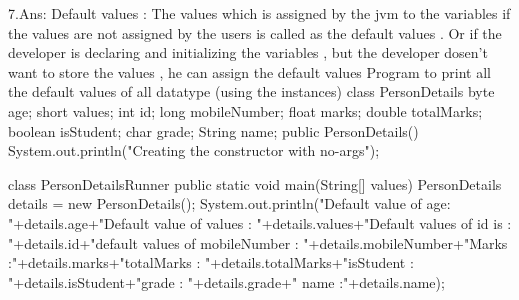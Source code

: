 7.Ans: Default values :  The values which is assigned by the jvm to the variables if the values are not assigned by the users is called as the default values . Or if the developer is declaring and initializing the variables , but the developer dosen't want to store the values , he can assign the default values 
Program to print all the default values of all datatype (using the instances) 
class PersonDetails{
	byte age;
	short values;
	int id;
	long mobileNumber;
	float marks;
	double totalMarks;
	boolean isStudent;
	char grade;
	String name;
	public 	PersonDetails()
	{
		System.out.println("Creating the constructor with no-args");
	}
}

class PersonDetailsRunner{
	public static void main(String[] values)
	{
		PersonDetails details = new PersonDetails();
		System.out.println("Default value of age: "+details.age+"Default value of values : "+details.values+"Default values of id is : "+details.id+"default values of mobileNumber : "+details.mobileNumber+"Marks :"+details.marks+"totalMarks : "+details.totalMarks+"isStudent : "+details.isStudent+"grade : "+details.grade+" name :"+details.name);
	}
}

